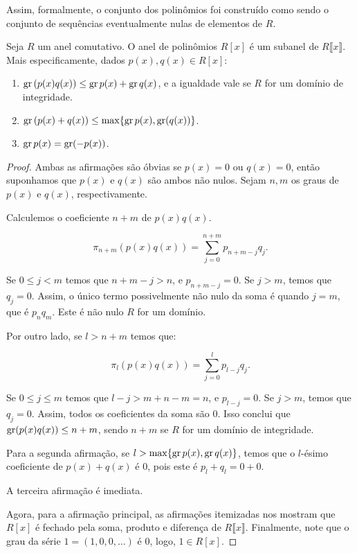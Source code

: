 Assim, formalmente, o conjunto dos polinômios foi construído como sendo o conjunto de sequências eventualmente nulas de elementos de $R$.

\begin{lemma}
    Seja $R$ um anel comutativo. O anel de polinômios $R[x]$ é um subanel de $R\llbracket x \rrbracket$. Mais especificamente, dados $p(x), q(x) \in R[x]$:

    \begin{enumerate}[label=\alph*)]
        \item $\operatorname{gr} \left(p(x)q(x)\right)\leq\operatorname{gr} p(x)+\operatorname{gr} q(x)$, e a igualdade vale se $R$ for um domínio de integridade.
        \item $\operatorname{gr}\left(p(x)+q(x)\right)\leq \max\{\operatorname{gr} p(x),\operatorname{gr}(q(x))\}$.
        \item $\operatorname{gr} p(x)=\operatorname{gr} (-p(x))$.

    \end{enumerate}
\end{lemma}

\begin{proof}
    Ambas as afirmações são óbvias se $p(x)=0$ ou $q(x)=0$, então suponhamos que $p(x)$ e $q(x)$ são ambos não nulos.
    Sejam $n, m$ os graus de $p(x)$ e $q(x)$, respectivamente.
    
    Calculemos o coeficiente $n+m$ de $p(x)q(x)$.

    $$\pi_{n+m}(p(x)q(x))=\sum_{j=0}^{n+m}p_{n+m-j}q_j.$$

    Se $0\leq j< m$ temos que $n+m-j>n$, e $p_{n+m-j}=0$. Se $j>m$, temos que $q_j=0$. Assim, o único termo possivelmente não nulo da soma é quando $j=m$, que é $p_nq_m$. Este é não nulo $R$ for um domínio.
    
    Por outro lado, se $l>n+m$ temos que:

    $$\pi_{l}(p(x)q(x))=\sum_{j=0}^{l}p_{l-j}q_j.$$

    Se $0\leq j\leq m$ temos que $l-j>m+n-m=n$, e $p_{l-j}=0$. Se $j>m$, temos que $q_j=0$. Assim, todos os coeficientes da soma são $0$.
    Isso conclui que $\operatorname{gr}(p(x)q(x))\leq n+m$, sendo $n+m$ se $R$ for um domínio de integridade.

    Para a segunda afirmação, se $l>\max\{\operatorname{gr} p(x), \operatorname{gr} q(x)\}$, temos que o $l$-ésimo coeficiente de $p(x)+q(x)$ é $0$, pois este é $p_l+q_l=0+0$.

    A terceira afirmação é imediata.

    Agora, para a afirmação principal, as afirmações itemizadas nos mostram que $R[x]$ é fechado pela soma, produto e diferença de $R\llbracket x \rrbracket$. Finalmente, note que o grau da série $1=(1, 0, 0, \dots)$ é $0$, logo, $1\in R[x]$.
\end{proof}

